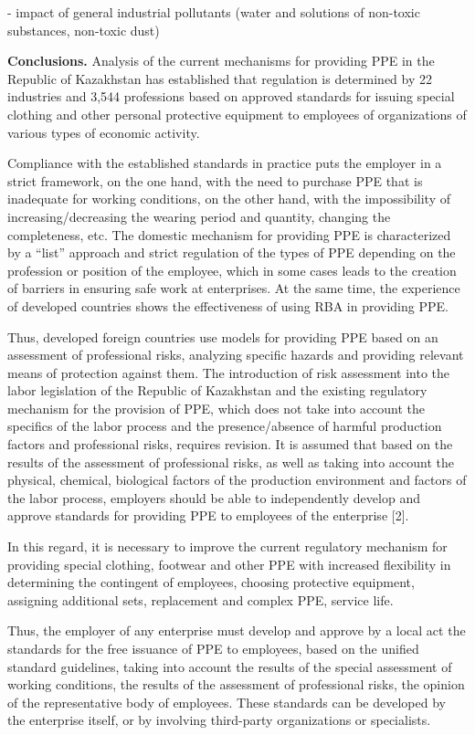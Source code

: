 {- impact of general industrial pollutants (water and solutions of
non-toxic substances, non-toxic dust)

{\bfseries Conclusions.} Analysis of the current mechanisms for providing
PPE in the Republic of Kazakhstan has established that regulation is
determined by 22 industries and 3,544 professions based on approved
standards for issuing special clothing and other personal protective
equipment to employees of organizations of various types of economic
activity.

Compliance with the established standards in practice puts the employer
in a strict framework, on the one hand, with the need to purchase PPE
that is inadequate for working conditions, on the other hand, with the
impossibility of increasing/decreasing the wearing period and quantity,
changing the completeness, etc. The domestic mechanism for providing PPE
is characterized by a ``list'' approach and strict regulation of the
types of PPE depending on the profession or position of the employee,
which in some cases leads to the creation of barriers in ensuring safe
work at enterprises. At the same time, the experience of developed
countries shows the effectiveness of using RBA in providing PPE.

Thus, developed foreign countries use models for providing PPE based on
an assessment of professional risks, analyzing specific hazards and
providing relevant means of protection against them. The introduction of
risk assessment into the labor legislation of the Republic of Kazakhstan
and the existing regulatory mechanism for the provision of PPE, which
does not take into account the specifics of the labor process and the
presence/absence of harmful production factors and professional risks,
requires revision. It is assumed that based on the results of the
assessment of professional risks, as well as taking into account the
physical, chemical, biological factors of the production environment and
factors of the labor process, employers should be able to independently
develop and approve standards for providing PPE to employees of the
enterprise {[}2{]}.

In this regard, it is necessary to improve the current regulatory
mechanism for providing special clothing, footwear and other PPE with
increased flexibility in determining the contingent of employees,
choosing protective equipment, assigning additional sets, replacement
and complex PPE, service life.

Thus, the employer of any enterprise must develop and approve by a local
act the standards for the free issuance of PPE to employees, based on
the unified standard guidelines, taking into account the results of the
special assessment of working conditions, the results of the assessment
of professional risks, the opinion of the representative body of
employees. These standards can be developed by the enterprise itself, or
by involving third-party organizations or specialists.

}

